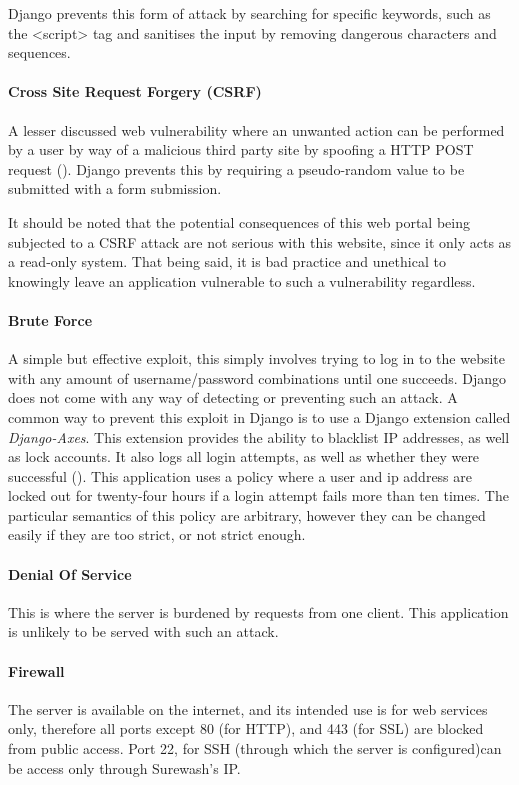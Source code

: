         Django prevents this form of attack by searching for specific keywords, such as the <script> tag and sanitises the input by removing dangerous characters and sequences.

        \paragraph{Cross Site Request Forgery (CSRF)}
        A lesser discussed web vulnerability where an unwanted action can be performed by a user by way of a malicious third party site by spoofing a HTTP POST request (\cite{zeller2008cross}). Django prevents this by requiring a pseudo-random value to be submitted with a form submission.

        It should be noted that the potential consequences of this web portal being subjected to a CSRF attack are not serious with this website, since it only acts as a read-only system. That being said, it is bad practice and unethical to knowingly leave an application vulnerable to such a vulnerability regardless.

        \paragraph{Brute Force}
        A simple but effective exploit, this simply involves trying to log in to the website with any amount of username/password combinations until one succeeds. Django does not come with any way of detecting or preventing such an attack. A common way to prevent this exploit in Django is to use a Django extension called {\slshape Django-Axes}. This extension provides the ability to blacklist IP addresses, as well as lock accounts. It also logs all login attempts, as well as whether they were successful (\cite{djangoaxes}). This application uses a policy where a user and ip address are locked out for twenty-four hours if a login attempt fails more than ten times. The particular semantics of this policy are arbitrary, however they can be changed easily if they are too strict, or not strict enough.

        \paragraph{Denial Of Service}
        This is where the server is burdened by requests from one client. This application is unlikely to be served with such an attack.

        \paragraph{Firewall}
        The server is available on the internet, and its intended use is for web services only, therefore all ports except 80 (for HTTP), and 443 (for SSL) are blocked from public access. Port 22, for SSH (through which the server is configured)can be access only through Surewash's IP.
    
